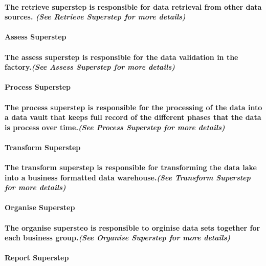 \documentclass{acm_proc_article-sp}
\begin{document}
\paragraph{The retrieve superstep is responsible for data retrieval from other data sources. \textit{(See Retrieve Superstep for more details)}}
\paragraph{\textbf{Assess Superstep}}
\paragraph{The assess superstep is responsible for the data validation in the factory.\textit{(See Assess Superstep for more details)}}
\paragraph{\textbf{Process Superstep}}
\paragraph{The process superstep is responsible for the processing of the data into a data vault that keeps full record of the different phases that the data is process over time.\textit{(See Process Superstep for more details)}}
\paragraph{\textbf{Transform Superstep}}
\paragraph{The transform superstep is responsible for transforming the data lake into a business formatted data warehouse.\textit{(See Transform Superstep for more details)}}
\paragraph{\textbf{Organise Superstep}}
\paragraph{The organise supersteo is responsible to orginise data sets together for each business group.\textit{(See Organise Superstep for more details)}}
\paragraph{\textbf{Report Superstep}}
\end{document}
